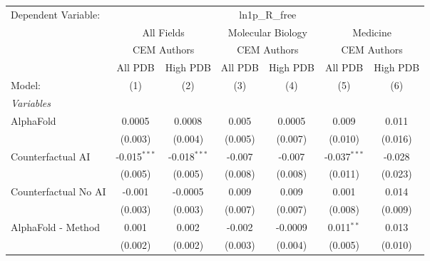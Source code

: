 \begingroup
\centering
\begin{tabular}{lcccccc}
   \tabularnewline \midrule \midrule
   Dependent Variable: & \multicolumn{6}{c}{ln1p\_R\_free}\\
 & \multicolumn{2}{c}{All Fields} & \multicolumn{2}{c}{Molecular Biology} & \multicolumn{2}{c}{Medicine} \\
\cmidrule(lr){2-3} \cmidrule(lr){4-5} \cmidrule(lr){6-7}
 & \multicolumn{2}{c}{CEM Authors} & \multicolumn{2}{c}{CEM Authors} & \multicolumn{2}{c}{CEM Authors} \\
\cmidrule(lr){2-3} \cmidrule(lr){4-5} \cmidrule(lr){6-7}
 & \multicolumn{1}{c}{All PDB} & \multicolumn{1}{c}{High PDB} & \multicolumn{1}{c}{All PDB} & \multicolumn{1}{c}{High PDB} & \multicolumn{1}{c}{All PDB} & \multicolumn{1}{c}{High PDB} \\
\cmidrule(lr){2-2} \cmidrule(lr){3-3} \cmidrule(lr){4-4} \cmidrule(lr){5-5} \cmidrule(lr){6-6} \cmidrule(lr){7-7}
   Model:                                                     & (1)            & (2)            & (3)     & (4)     & (5)            & (6)\\  
   \midrule
   \emph{Variables}\\
   AlphaFold                                                  & 0.0005         & 0.0008         & 0.005   & 0.0005  & 0.009          & 0.011\\   
                                                              & (0.003)        & (0.004)        & (0.005) & (0.007) & (0.010)        & (0.016)\\   
   Counterfactual AI                                          & -0.015$^{***}$ & -0.018$^{***}$ & -0.007  & -0.007  & -0.037$^{***}$ & -0.028\\   
                                                              & (0.005)        & (0.005)        & (0.008) & (0.008) & (0.011)        & (0.023)\\   
   Counterfactual No AI                                       & -0.001         & -0.0005        & 0.009   & 0.009   & 0.001          & 0.014\\   
                                                              & (0.003)        & (0.003)        & (0.007) & (0.007) & (0.008)        & (0.009)\\   
   AlphaFold - Method                                         & 0.001          & 0.002          & -0.002  & -0.0009 & 0.011$^{**}$   & 0.013\\   
                                                              & (0.002)        & (0.002)        & (0.003) & (0.004) & (0.005)        & (0.010)\\   

\end{tabular}

